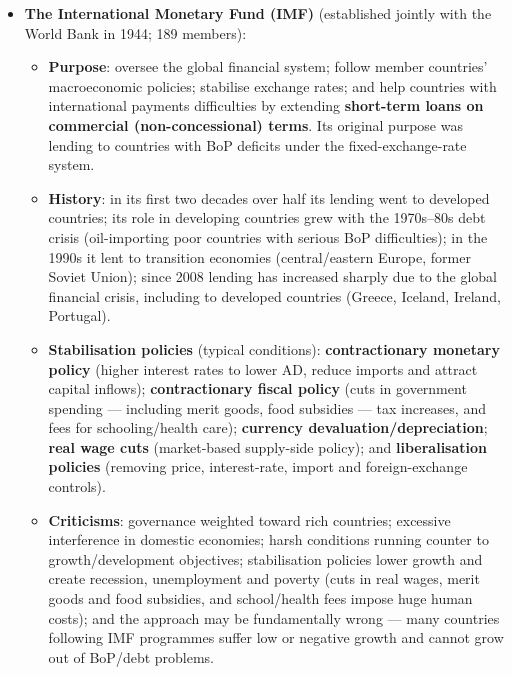 \documentclass[a4paper,12pt]{article}
\begin{document}
\begin{itemize}
\begin{itemize}
    \item \textbf{Criticisms}: early socially unsound projects (hydroelectric dams displacing indigenous people) and environmentally unsustainable projects; governance is weighted by financial contributions, giving rich countries far greater power; excessive interference in domestic policy; conditionality deprives countries of control over domestic economic activities; insufficient funds for poverty-oriented lending and for HIPC debt relief; the 2019 \textit{World Development Report} was criticised by the ILO for excessive focus on labour-market flexibility and for ignoring negative effects on workers; and it has been criticised for encouraging land grabs through privatisation and land takeovers that displace poor farmers.
  \end{itemize}
  \item \textbf{The International Monetary Fund (IMF)} (established jointly with the World Bank in 1944; 189 members):
  \begin{itemize}
    \item \textbf{Purpose}: oversee the global financial system; follow member countries' macroeconomic policies; stabilise exchange rates; and help countries with international payments difficulties by extending \textbf{short-term loans on commercial (non-concessional) terms}. Its original purpose was lending to countries with BoP deficits under the fixed-exchange-rate system.
    \item \textbf{History}: in its first two decades over half its lending went to developed countries; its role in developing countries grew with the 1970s--80s debt crisis (oil-importing poor countries with serious BoP difficulties); in the 1990s it lent to transition economies (central/eastern Europe, former Soviet Union); since 2008 lending has increased sharply due to the global financial crisis, including to developed countries (Greece, Iceland, Ireland, Portugal).
    \item \textbf{Stabilisation policies} (typical conditions): \textbf{contractionary monetary policy} (higher interest rates to lower AD, reduce imports and attract capital inflows); \textbf{contractionary fiscal policy} (cuts in government spending --- including merit goods, food subsidies --- tax increases, and fees for schooling/health care); \textbf{currency devaluation/depreciation}; \textbf{real wage cuts} (market-based supply-side policy); and \textbf{liberalisation policies} (removing price, interest-rate, import and foreign-exchange controls).
    \item \textbf{Criticisms}: governance weighted toward rich countries; excessive interference in domestic economies; harsh conditions running counter to growth/development objectives; stabilisation policies lower growth and create recession, unemployment and poverty (cuts in real wages, merit goods and food subsidies, and school/health fees impose huge human costs); and the approach may be fundamentally wrong --- many countries following IMF programmes suffer low or negative growth and cannot grow out of BoP/debt problems.

\end{itemize}
\end{itemize}
\end{document}

